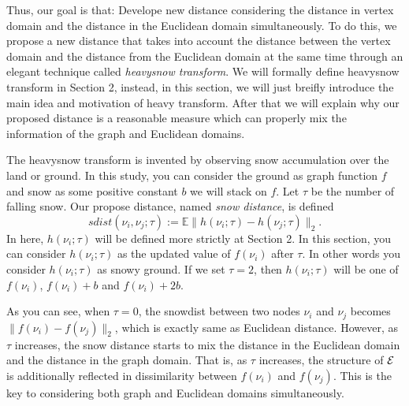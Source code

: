 \documentclass[preprint, review, 12pt]{article}
\theoremstyle{definition}
\theoremstyle{remark}
\begin{document}
Thus, our goal is that: Develope new distance considering the distance in vertex domain and the distance in the Euclidean domain simultaneously. To do this, we propose a new distance that takes into account the distance between the vertex domain and the distance from the Euclidean domain at the same time through an elegant technique called \emph{heavysnow transform}. We will formally define heavysnow transform in Section 2, instead, in this section, we will just breifly introduce the main idea and motivation of heavy transform. After that we will explain why our proposed distance is a reasonable measure which can properly mix the information of the graph and Euclidean domains. 

The heavysnow transform is invented by observing snow accumulation over the land or ground. In this study, you can consider the ground as graph function $f$ and snow as some positive constant $b$ we will stack on $f$. Let $\tau$ be the number of falling snow. Our propose distance, named \emph{snow distance}, is defined 
\[
sdist(\nu_i,\nu_j; \tau):=\mathbb{E}\| h(\nu_i; \tau )- h(\nu_j;\tau)\|_2.
\]
In here, $h(\nu_i;\tau)$ will be defined more strictly at Section 2. In this section, you can consider $h(\nu_i;\tau)$ as the updated value of $f(\nu_i)$ after $\tau$. In other words you consider $h(\nu_i;\tau)$ as snowy ground. If we set $\tau=2$, then $h(\nu_i;\tau)$ will be one of $f(\nu_i)$, $f(\nu_i)+b$ and $f(\nu_i)+2b$. 

As you can see, when $\tau = 0$, the snowdist between two nodes $\nu_i$ and $\nu_j$ becomes $\|f(\nu_i)-f(\nu_j)\|_2$, which is exactly same as Euclidean distance. However, as $\tau$ increases, the snow distance starts to mix the distance in the Euclidean domain and the distance in the graph domain. That is, as $\tau$ increases, the structure of ${\cal E}$ is additionally reflected in dissimilarity between $f(\nu_i)$ and $f(\nu_j)$. This is the key to considering both graph and Euclidean domains simultaneously. 
\end{document}
